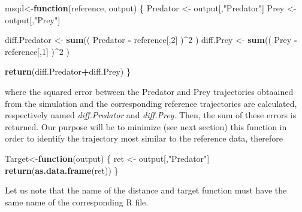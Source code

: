 \documentclass[
]{article}
\newenvironment{Shaded}{\begin{snugshade}}{\end{snugshade}}
\newcommand{\ControlFlowTok}[1]{\textcolor[rgb]{0.13,0.29,0.53}{\textbf{#1}}}
\newcommand{\DecValTok}[1]{\textcolor[rgb]{0.00,0.00,0.81}{#1}}
\newcommand{\KeywordTok}[1]{\textcolor[rgb]{0.13,0.29,0.53}{\textbf{#1}}}
\newcommand{\NormalTok}[1]{#1}
\newcommand{\OperatorTok}[1]{\textcolor[rgb]{0.81,0.36,0.00}{\textbf{#1}}}
\newcommand{\StringTok}[1]{\textcolor[rgb]{0.31,0.60,0.02}{#1}}
\begin{document}
\begin{Shaded}
\begin{Highlighting}[]
\NormalTok{msqd<-}\ControlFlowTok{function}\NormalTok{(reference, output)}
\NormalTok{\{}
\NormalTok{    Predator <-}\StringTok{ }\NormalTok{output[,}\StringTok{"Predator"}\NormalTok{]}
\NormalTok{    Prey <-}\StringTok{ }\NormalTok{output[,}\StringTok{"Prey"}\NormalTok{]}

\NormalTok{    diff.Predator <-}\StringTok{ }\KeywordTok{sum}\NormalTok{(( Predator }\OperatorTok{-}\StringTok{ }\NormalTok{reference[,}\DecValTok{2}\NormalTok{] )}\OperatorTok{^}\DecValTok{2}\NormalTok{ )}
\NormalTok{    diff.Prey <-}\StringTok{ }\KeywordTok{sum}\NormalTok{(( Prey }\OperatorTok{-}\StringTok{ }\NormalTok{reference[,}\DecValTok{1}\NormalTok{] )}\OperatorTok{^}\DecValTok{2}\NormalTok{ )}

    \KeywordTok{return}\NormalTok{(diff.Predator}\OperatorTok{+}\NormalTok{diff.Prey)}
\NormalTok{\}}
\end{Highlighting}
\end{Shaded}

where the squared error between the Predator and Prey trajectories
obtaained from the simulation and the corresponding reference
trajectories are calculated, respectively named \emph{diff.Predator} and
\emph{diff.Prey}. Then, the sum of these errors is returned. Our purpose
will be to minimize (see next section) this function in order to
identify the trajectory most similar to the reference data, therefore

\begin{Shaded}
\begin{Highlighting}[]
\NormalTok{Target<-}\ControlFlowTok{function}\NormalTok{(output)}
\NormalTok{\{}
\NormalTok{    ret <-}\StringTok{ }\NormalTok{output[,}\StringTok{"Predator"}\NormalTok{]}
    \KeywordTok{return}\NormalTok{(}\KeywordTok{as.data.frame}\NormalTok{(ret))}
\NormalTok{\}}
\end{Highlighting}
\end{Shaded}

Let us note that the name of the distance and target function must have
the same name of the corresponding R file.
\end{document}
